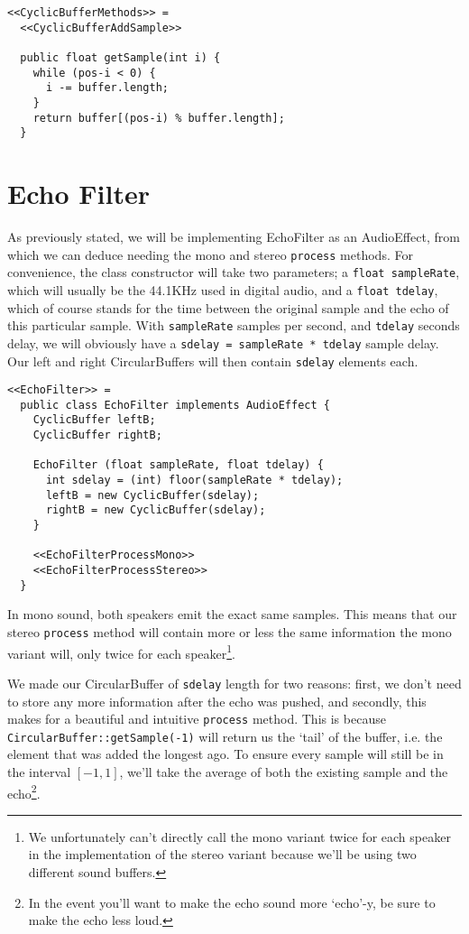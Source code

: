 \documentclass[11pt]{amsart}
\begin{document}
\begin{verbatim}
<<CyclicBufferMethods>> = 
  <<CyclicBufferAddSample>>

  public float getSample(int i) {
    while (pos-i < 0) {
      i -= buffer.length;
    }
    return buffer[(pos-i) % buffer.length];
  }
\end{verbatim}

\section{Echo Filter}
As previously stated, we will be implementing EchoFilter as an AudioEffect, from which we can deduce needing the mono and stereo \texttt{process} methods. For convenience, the class constructor will take two parameters; a \texttt{float sampleRate}, which will usually be the 44.1KHz used in digital audio, and a \texttt{float tdelay}, which of course stands for the time between the original sample and the echo of this particular sample. With \texttt{sampleRate} samples per second, and \texttt{tdelay} seconds delay, we will obviously have a \texttt{sdelay = sampleRate * tdelay} sample delay. Our left and right CircularBuffers will then contain \texttt{sdelay} elements each.

\begin{verbatim}
<<EchoFilter>> = 
  public class EchoFilter implements AudioEffect {
    CyclicBuffer leftB;
    CyclicBuffer rightB;

    EchoFilter (float sampleRate, float tdelay) {
      int sdelay = (int) floor(sampleRate * tdelay);
      leftB = new CyclicBuffer(sdelay);
      rightB = new CyclicBuffer(sdelay);
    }

    <<EchoFilterProcessMono>>
    <<EchoFilterProcessStereo>>
  }
\end{verbatim}

In mono sound, both speakers emit the exact same samples. This means that our stereo \texttt{process} method will contain more or less the same information the mono variant will, only twice for each speaker\footnote{We unfortunately can't directly call the mono variant twice for each speaker in the implementation of the stereo variant because we'll be using two different sound buffers.}.

We made our CircularBuffer of \texttt{sdelay} length for two reasons: first, we don't need to store any more information after the echo was pushed, and secondly, this makes for a beautiful and intuitive \texttt{process} method. This is because \texttt{CircularBuffer::getSample(-1)} will return us the `tail' of the buffer, i.e. the element that was added the longest ago. To ensure every sample will still be in the interval $[-1,1]$, we'll take the average of both the existing sample and the echo\footnote{In the event you'll want to make the echo sound more `echo'-y, be sure to make the echo less loud.}.
\end{document}
